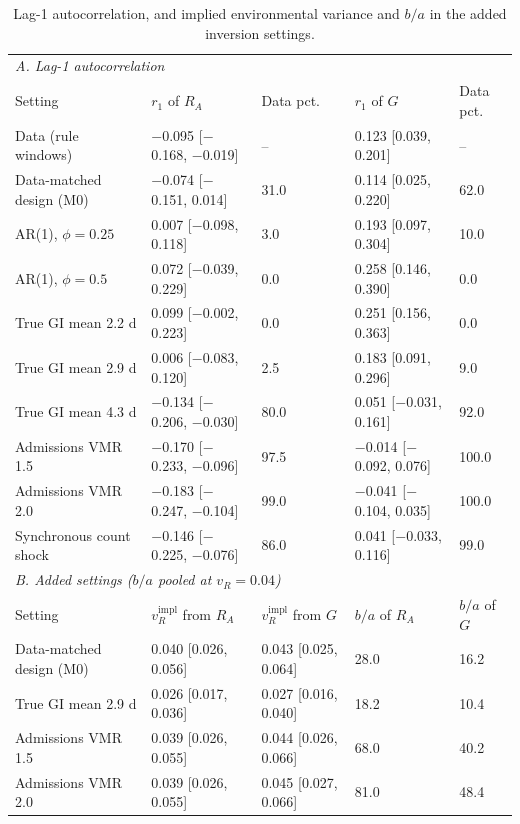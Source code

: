 \begin{table}[htbp]
\centering
\footnotesize
\setlength{\tabcolsep}{4pt}
\caption{Lag-1 autocorrelation, and implied environmental variance and $b/a$ in the added inversion settings.}
\label{tab:s10}
\begin{tabular}{lllll}
\toprule
\multicolumn{5}{l}{\textit{A. Lag-1 autocorrelation}}\\
Setting & $r_1$ of $R_A$ & Data pct. & $r_1$ of $G$ & Data pct. \\
\midrule
Data (rule windows) & $-$0.095 [$-$0.168, $-$0.019] & -- & 0.123 [0.039, 0.201] & -- \\
Data-matched design (M0) & $-$0.074 [$-$0.151, 0.014] & 31.0 & 0.114 [0.025, 0.220] & 62.0 \\
AR(1), $\phi=0.25$ & 0.007 [$-$0.098, 0.118] & 3.0 & 0.193 [0.097, 0.304] & 10.0 \\
AR(1), $\phi=0.5$ & 0.072 [$-$0.039, 0.229] & 0.0 & 0.258 [0.146, 0.390] & 0.0 \\
True GI mean 2.2 d & 0.099 [$-$0.002, 0.223] & 0.0 & 0.251 [0.156, 0.363] & 0.0 \\
True GI mean 2.9 d & 0.006 [$-$0.083, 0.120] & 2.5 & 0.183 [0.091, 0.296] & 9.0 \\
True GI mean 4.3 d & $-$0.134 [$-$0.206, $-$0.030] & 80.0 & 0.051 [$-$0.031, 0.161] & 92.0 \\
Admissions VMR 1.5 & $-$0.170 [$-$0.233, $-$0.096] & 97.5 & $-$0.014 [$-$0.092, 0.076] & 100.0 \\
Admissions VMR 2.0 & $-$0.183 [$-$0.247, $-$0.104] & 99.0 & $-$0.041 [$-$0.104, 0.035] & 100.0 \\
Synchronous count shock & $-$0.146 [$-$0.225, $-$0.076] & 86.0 & 0.041 [$-$0.033, 0.116] & 99.0 \\
\midrule
\multicolumn{5}{l}{\textit{B. Added settings ($b/a$ pooled at $v_R=0.04$)}}\\
Setting & $v_R^{\mathrm{impl}}$ from $R_A$ & $v_R^{\mathrm{impl}}$ from $G$ & $b/a$ of $R_A$ & $b/a$ of $G$ \\
\midrule
Data-matched design (M0) & 0.040 [0.026, 0.056] & 0.043 [0.025, 0.064] & 28.0 & 16.2 \\
True GI mean 2.9 d & 0.026 [0.017, 0.036] & 0.027 [0.016, 0.040] & 18.2 & 10.4 \\
Admissions VMR 1.5 & 0.039 [0.026, 0.055] & 0.044 [0.026, 0.066] & 68.0 & 40.2 \\
Admissions VMR 2.0 & 0.039 [0.026, 0.055] & 0.045 [0.027, 0.066] & 81.0 & 48.4 \\

\end{tabular}
\end{table}
